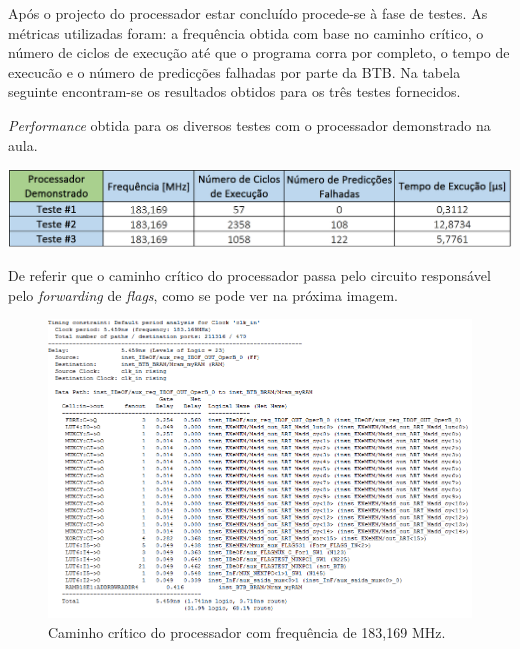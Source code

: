 \documentclass[11pt]{article}
\numberwithin{equation}{section}
\begin{document}
Após o projecto do processador estar concluído procede-se à fase de testes. As métricas utilizadas foram: a frequência obtida com base no caminho crítico, o número de ciclos de execução até que o programa corra por completo, o tempo de execucão e o número de predicções falhadas por parte da BTB. Na tabela seguinte encontram-se os resultados obtidos para os três testes fornecidos.

\begin{table}[H]
	\centering
	\caption{\textit{Performance} obtida para os diversos testes com o processador demonstrado na aula.}
	\vspace{-1.5mm}
	\includegraphics[keepaspectratio=true, scale=0.40]{tabelas/processadororiginal}
	\label{tab:processadororiginal}
\end{table}

De referir que o caminho crítico do processador passa pelo circuito responsável pelo \textit{forwarding} de \textit{flags}, como se pode ver na próxima imagem.

\begin{figure}[H]
	\centering
	\includegraphics[keepaspectratio=true, scale=0.35]{imagens/freq183}
	\vspace{-0.5em}
	\caption{Caminho crítico do processador com frequência de 183,169 MHz.}
	\label{fig:183}
	\vspace{-0.8em}
\end{figure} 
\end{document}
